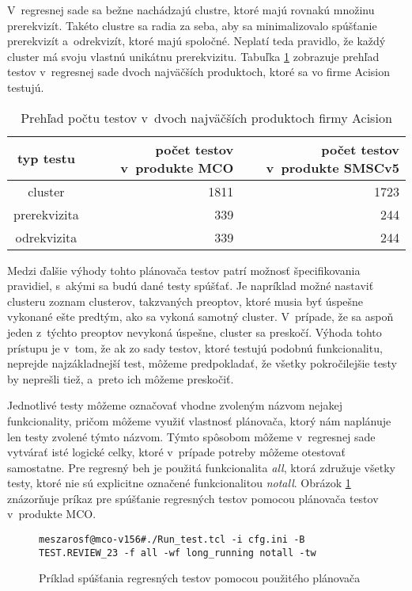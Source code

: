 V~regresnej sade sa bežne nachádzajú clustre, ktoré majú rovnakú množinu prerekvizít. Takéto clustre sa radia za seba, aby sa minimalizovalo
spúšťanie prerekvizít a~odrekvizít, ktoré majú spoločné. Neplatí teda pravidlo, že každý cluster má svoju vlastnú unikátnu prerekvizitu.
Tabuľka \ref{tabulka:pocet_testov} zobrazuje prehľad testov v~regresnej sade dvoch najväčších produktoch,
ktoré sa vo firme Acision testujú.

\begin{table}
  \begin{center}
    \begin{tabular}{| c | r | r |}
    \hline
    typ testu & počet testov v~produkte MCO & počet testov v~produkte SMSCv5 \\ \hline
    cluster & 1811 & 1723 \\ \hline
    prerekvizita & 339 & 244 \\ \hline
    odrekvizita & 339 & 244 \\
    \hline
    \end{tabular}
    \label{tabulka:pocet_testov}
    \caption{Prehľad počtu testov v~dvoch najväčších produktoch firmy Acision}
  \end{center}
\end{table}


Medzi ďalšie výhody tohto plánovača testov patrí možnosť špecifikovania pravidiel, s~akými sa budú dané testy spúšťať.
Je napríklad možné nastaviť clusteru zoznam clusterov, takzvaných preoptov, ktoré musia byť úspešne vykonané ešte predtým, ako sa vykoná samotný
cluster. V~prípade, že sa aspoň jeden z~týchto preoptov nevykoná úspešne, cluster sa preskočí.
Výhoda tohto prístupu je v~tom, že ak zo sady testov, ktoré testujú podobnú funkcionalitu, neprejde najzákladnejší test,
môžeme predpokladať, že všetky pokročilejšie testy by neprešli tiež, a~preto ich môžeme preskočiť.

Jednotlivé testy môžeme označovať vhodne zvoleným názvom nejakej funkcionality, pričom môžeme využiť vlastnosť 
plánovača, ktorý nám naplánuje len testy zvolené týmto názvom. Týmto spôsobom môžeme v~regresnej sade vytvárať isté logické celky,
ktoré v~prípade potreby môžeme otestovať samostatne. Pre regresný beh je použitá funkcionalita {\it all}, ktorá združuje 
všetky testy, ktoré nie sú explicitne označené funkcionalitou {\it notall}. Obrázok \ref{obrazok:priklad_spustania_testov} znázorňuje príkaz pre spúšťanie
regresných testov pomocou plánovača testov v~produkte MCO.

\begin{figure}[h]
\begin{lstlisting}
meszarosf@mco-v156#./Run_test.tcl -i cfg.ini -B TEST.REVIEW_23 -f all -wf long_running notall -tw
\end{lstlisting}
\caption{Príklad spúšťania regresných testov pomocou použitého plánovača}
\label{obrazok:priklad_spustania_testov}
\end{figure}

